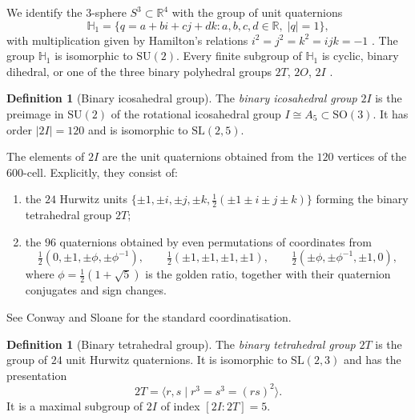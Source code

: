 \documentclass[10pt,reqno]{amsart}
\theoremstyle{plain}
\theoremstyle{definition}
\newtheorem{definition}[theorem]{Definition}
\begin{document}
We identify the $3$-sphere $S^3 \subset \mathbb{R}^4$ with the group of unit quaternions
\begin{equation}
\mathbb{H}_1 = \{ q = a + bi + cj + dk : a,b,c,d \in \mathbb{R},\; |q|=1 \},
\end{equation}
with multiplication given by Hamilton's relations $i^2=j^2=k^2=ijk=-1$ \cite{Hamilton1843}. The group $\mathbb{H}_1$ is isomorphic to $\mathrm{SU}(2)$. Every finite subgroup of $\mathbb{H}_1$ is cyclic, binary dihedral, or one of the three binary polyhedral groups $2T$, $2O$, $2I$ \cite{duVal1964,CS1999}.

\begin{definition}[Binary icosahedral group]
The \emph{binary icosahedral group} $2I$ is the preimage in $\mathrm{SU}(2)$ of the rotational icosahedral group $I \cong A_5 \subset \mathrm{SO}(3)$. It has order $|2I| = 120$ and is isomorphic to $\mathrm{SL}(2,5)$.
\end{definition}

The elements of $2I$ are the unit quaternions obtained from the $120$ vertices of the 600-cell. Explicitly, they consist of:
\begin{enumerate}
\item[(i)] the $24$ Hurwitz units $\{ \pm1, \pm i, \pm j, \pm k, \frac12(\pm1\pm i\pm j\pm k) \}$ forming the binary tetrahedral group $2T$;
\item the $96$ quaternions obtained by even permutations of coordinates from
\begin{equation}\label{eq:golden}
\tfrac12(0, \pm1, \pm\phi, \pm\phi^{-1}),\qquad
\tfrac12(\pm1, \pm1, \pm1, \pm1),\qquad
\tfrac12(\pm\phi, \pm\phi^{-1}, \pm1, 0),
\end{equation}
where $\phi = \frac12(1+\sqrt5)$ is the golden ratio, together with their quaternion conjugates and sign changes.
\end{enumerate}
See Conway and Sloane \cite[Ch.~8]{CS1999} for the standard coordinatisation.

\begin{definition}[Binary tetrahedral group]
The \emph{binary tetrahedral group} $2T$ is the group of $24$ unit Hurwitz quaternions. It is isomorphic to $\mathrm{SL}(2,3)$ and has the presentation
\begin{equation}
2T = \langle r, s \mid r^3 = s^3 = (rs)^2 \rangle.
\end{equation}
It is a maximal subgroup of $2I$ of index $[2I : 2T] = 5$.
\end{definition}
\end{document}

